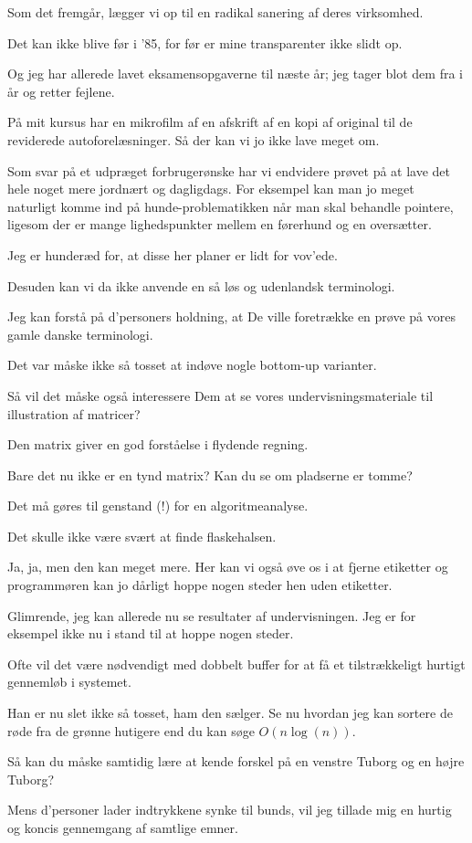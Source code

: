 \documentclass[a4paper,11pt]{article}
\begin{document}
\begin{sketch}
 Som det fremgår, lægger vi op til en radikal sanering af
deres virksomhed.

 Det kan ikke blive før i '85, for før er mine transparenter
ikke slidt op.

 Og jeg har allerede lavet eksamensopgaverne til næste år; jeg
tager blot dem fra i år og retter fejlene.

 På mit kursus har en mikrofilm af en afskrift af en kopi af
original til de reviderede autoforelæsninger.  Så der kan vi jo ikke
lave meget om.

 Som svar på et udpræget forbrugerønske har vi endvidere
prøvet på at lave det hele noget mere jordnært og dagligdags.  For
eksempel kan man jo meget naturligt komme ind på hunde-problematikken
når man skal behandle pointere, ligesom der er mange lighedspunkter
mellem en førerhund og en oversætter.

 Jeg er hunderæd for, at disse her planer er lidt for vov'ede.

 Desuden kan vi da ikke anvende en så løs og udenlandsk terminologi.


 Jeg kan forstå på d'personers holdning, at De ville
foretrække en prøve på vores gamle danske terminologi. 

 Det var måske ikke så tosset at indøve nogle bottom-up varianter.

 Så vil det måske også interessere Dem at se vores
undervisningsmateriale til illustration af matricer? 

 Den matrix giver en god forståelse i flydende regning.

 Bare det nu ikke er en tynd matrix?  Kan du se om pladserne
er tomme?

 Det må gøres til genstand (!) for en algoritmeanalyse.

 Det skulle ikke være svært at finde flaskehalsen.

 Ja, ja, men den kan meget mere.  Her kan vi også øve os i at
fjerne etiketter  og programmøren kan
jo dårligt hoppe nogen steder hen uden etiketter.

 Glimrende, jeg kan allerede nu se resultater af
undervisningen.  Jeg er for eksempel ikke nu i stand til at hoppe
nogen steder.

 Ofte vil det være nødvendigt med dobbelt buffer for at få
et tilstrækkeligt hurtigt gennemløb i systemet.  

 Han er nu slet ikke så tosset, ham den sælger.  Se nu hvordan
jeg kan sortere de røde fra de grønne hutigere end du kan søge
$O(n\log(n))$.

 Så kan du måske samtidig lære at kende forskel på en venstre
Tuborg og en højre Tuborg?

 Mens d'personer lader indtrykkene synke til bunds, vil jeg
tillade mig en hurtig og koncis gennemgang af samtlige emner.

\end{sketch}
\end{document}
